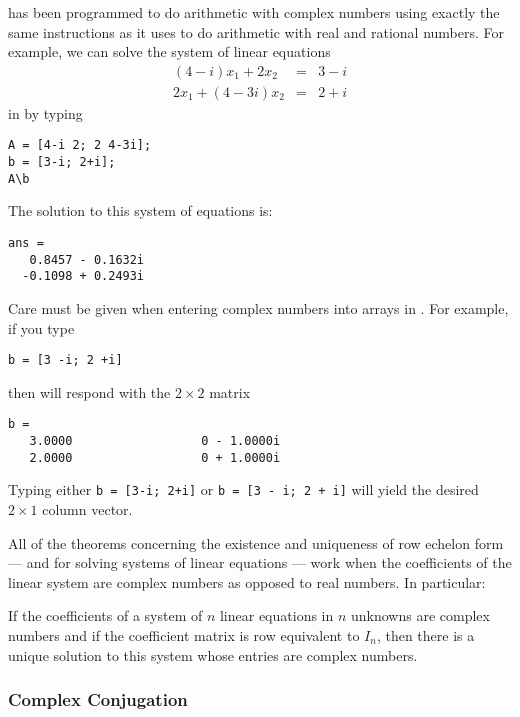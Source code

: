 \documentclass{ximera}
\begin{document}
\Matlab has been programmed to do arithmetic with complex numbers
using exactly the same instructions as it uses to do arithmetic
with real and rational numbers.  For example, we can solve the
system of linear equations
\begin{eqnarray*}
(4-i)x_1+2x_2 & = & 3-i \\
2x_1 +(4-3i)x_2 & = & 2+i
\end{eqnarray*}
in \Matlab by typing
\begin{verbatim}
A = [4-i 2; 2 4-3i];
b = [3-i; 2+i];
A\b
\end{verbatim} \index{\computer!$\backslash$}
The solution to this system of equations is:
\begin{verbatim}
ans =
   0.8457 - 0.1632i
  -0.1098 + 0.2493i
\end{verbatim}  

\footnotesize
{} Care must be given when entering complex
numbers into arrays in \Matlabp.  For example, if you type
\begin{verbatim}
b = [3 -i; 2 +i]
\end{verbatim}
then \Matlab will respond with the $2\times 2$ matrix
\begin{verbatim}
b =
   3.0000                  0 - 1.0000i
   2.0000                  0 + 1.0000i
\end{verbatim}
Typing either {\tt b = [3-i; 2+i]} or {\tt b = [3 - i; 2 + i]} will
yield the desired $2\times 1$ column vector.

\normalsize

All of the theorems concerning the existence and uniqueness
of row echelon form --- and for solving systems of linear
equations --- work when the coefficients of the linear system
are complex numbers as opposed to real numbers.  In particular:

\begin{thm}  \label{T:complexcoeff}
If the coefficients of a system of $n$ linear equations in $n$
unknowns are complex numbers and if the coefficient matrix is
row equivalent to $I_n$, then there is a unique solution to
this system whose entries are complex numbers.
\end{thm}  

\subsubsection*{Complex Conjugation}
\end{document}
